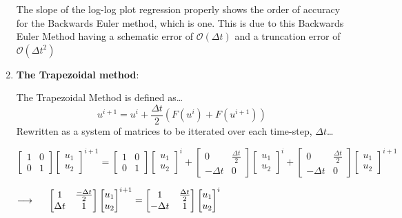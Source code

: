 \documentclass[12pt,letterpaper]{article}
\begin{document}
\begin{enumerate}
The slope of the log-log plot regression properly shows the order of accuracy for the Backwards Euler method, which is one. 
This is due to this Backwards Euler Method having a schematic error of $\mathcal{O}(\Delta t)$ and a truncation error of $\mathcal{O}(\Delta t^{2})$ 
\newpage
	\item \textbf{The Trapezoidal method}:\
	
The Trapezoidal Method is defined as\ldots
\begin{equation}
    u^{i+1} = u^{i} + \frac{\Delta t}{2} \left( F(u^{i}) + F(u^{i+1}) \right)
\end{equation}
Rewritten as a system of matrices to be itterated over each time-step, $\Delta t$\ldots
\begin{center} 
    $\begin{bmatrix} 1&0 \\ 0&1 \end{bmatrix} \begin{bmatrix} u_{1} \\ u_{2} \end{bmatrix}^{i+1} = \begin{bmatrix} 1&0 \\ 0&1 \end{bmatrix} \begin{bmatrix} u_{1} \\ u_{2} \end{bmatrix}^{i} +  \begin{bmatrix} 0&\frac{\Delta t}{2} \\ -\Delta t &0 \end{bmatrix}\begin{bmatrix} u_{1} \\ u_{2} \end{bmatrix}^{i} + \begin{bmatrix} 0&\frac{\Delta t}{2} \\ -\Delta t &0 \end{bmatrix}\begin{bmatrix} u_{1} \\ u_{2} \end{bmatrix}^{i+1}$
\end{center}

\begin{center} 
    $\longrightarrow \hspace{0.5 cm} \begin{bmatrix} 1&\frac{-\Delta t}{2} \\ \Delta t &1 \end{bmatrix} \begin{bmatrix} u_{1} \\ u_{2} \end{bmatrix}^{i+1} = \begin{bmatrix} 1&\frac{\Delta t}{2} \\ -\Delta t &1 \end{bmatrix}\begin{bmatrix} u_{1} \\ u_{2} \end{bmatrix}^{i}$
\end{center}


\end{enumerate}
\end{document}
